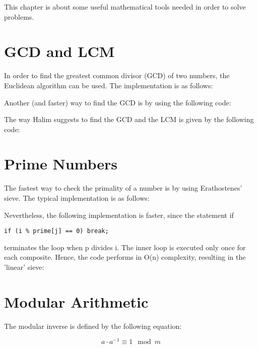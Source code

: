 This chapter is about some useful mathematical tools needed in order to solve problems.

\section{GCD and LCM}

In order to find the greatest common divisor (GCD) of two numbers, the Euclidean algorithm can be used. The implementation is as follows:



Another (and faster) way to find the GCD is by using the following code:



The way Halim suggests to find the GCD and the LCM is given by the following code:



\section{Prime Numbers}

The fastest way to check the primality of a number is by using Erathostenes' sieve. The typical implementation is as follows:



Nevertheless, the following implementation is faster, since  the statement if 
\begin{verbatim}
if (i % prime[j] == 0) break;
\end{verbatim}
 terminates the loop when p divides i. The inner loop is executed only once for each composite. Hence, the code performs in O(n) complexity, resulting in the 'linear' sieve:






\section{Modular Arithmetic}

The modular inverse is defined by the following equation:

\begin{equation}
a \cdot a^{-1} \equiv 1 \mod m
\end{equation}

